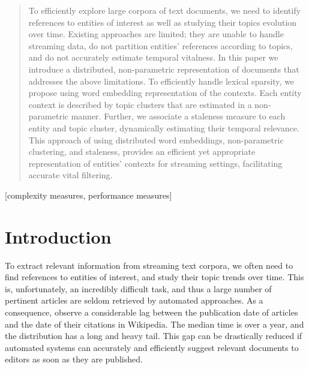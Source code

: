 \documentclass{sig-alternate}
\begin{document}
\begin{abstract} 

To efficiently explore large corpora of text documents, we need to identify references to entities of interest as well as studying their topics evolution over time. Existing approaches are limited; they are unable to handle streaming data, do not partition entities' references according to topics, and do not accurately estimate temporal vitalness.
In this paper we introduce a distributed, non-parametric representation of documents that addresses the above limitations. To efficiently handle lexical sparsity, we propose using word embedding representation of the contexts. Each entity context is described by topic clusters that are estimated in a non-parametric manner. Further, we associate a staleness measure to each entity and topic cluster, dynamically estimating their temporal relevance. %
This approach of using distributed word embeddings, non-parametric clustering, and staleness, provides an efficient yet appropriate representation of entities' contexts for streaming settings, facilitating accurate vital filtering.


\end{abstract} 

[complexity measures, performance measures]



\section{Introduction}
\label{intro}

To extract relevant information from streaming text corpora, we often need to find references to entities of interest, and study their topic trends over time. 
This is, unfortunately, an incredibly difficult task, and thus a large number of pertinent articles are seldom retrieved by automated approaches.
As a consequence, \citet{frank12} observe a considerable lag between the publication date of articles and the date of their citations in Wikipedia.
The median time is over a year, and the distribution has a long and heavy tail. 
This gap can be drastically reduced if automated systems can accurately and efficiently suggest relevant documents to editors as soon as they are published.
\end{document}
